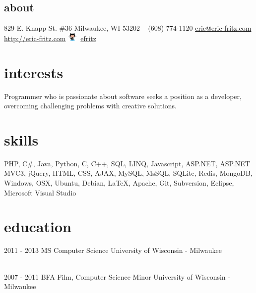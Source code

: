 \documentclass[]{fritz-resume}
\begin{document}


\begin{aside}
  \section{about}
    829 E. Knapp St. \#36
    Milwaukee, WI 53202
    ~
    (608) 774-1120
    \href{mailto:eric@eric-fritz.com?subject=Resume}{eric@eric-fritz.com}
    \href{http://eric-fritz.com}{http://eric-fritz.com}
    \includegraphics[height=12pt]{github.eps}~\href{http://github.com/efritz}{efritz}
\end{aside}


\section{interests}

{\small Programmer who is passionate about software seeks a position as a developer, overcoming challenging problems with creative solutions.}


\section{skills}

{\small PHP, C\#, Java, Python, C, C++, SQL, LINQ, Javascript, ASP.NET, ASP.NET MVC3, jQuery, HTML, CSS, AJAX, MySQL, MsSQL, SQLite, Redis, MongoDB, Windows, OSX, Ubuntu, Debian, \LaTeX{}, Apache, Git, Subversion, Eclipse, Microsoft Visual Studio}


\section{education}

\begin{entrylist}
  \entry
    {2011 - 2013}
    {MS Computer Science}
    {University of Wisconsin - Milwaukee}
    {
       \\
       \\
    }

  \entry
    {2007 - 2011}
    {BFA Film, Computer Science Minor}
    {University of Wisconsin - Milwaukee}
    {
       \\
    }
\end{entrylist}
\end{document}
